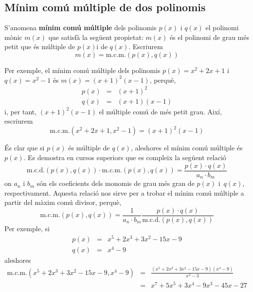 \subsection{Mínim comú múltiple de dos polinomis}

S'anomena \textbf{mínim comú múltiple} dels polinomis $p(x)$
i $q(x)$ el polinomi mònic $m(x)$ que satisfà la següent
propietat: $m(x)$ és el polinomi de grau més petit que és múltiple de $p(x) $i de $q(x)$. Escriurem\begin{equation*}
m(x)=\text{m.c.m.}\left( p(x),q(x)\right)
\end{equation*}

Per exemple, el mínim comú múltiple dels polinomis $p(x)=x^{2}+2x+1$ i $q(x)=x^{2}-1$ és $m(x)=(x+1)^{2}(x-1)$, perquè,\begin{eqnarray*}
p(x) &=&(x+1)^{2} \\
q(x) &=&(x+1)(x-1)
\end{eqnarray*}i, per tant, $(x+1)^{2}(x-1)$ el múltiple comú de més petit
grau. Així, escriurem\begin{equation*}
\text{m.c.m.}\left( x^{2}+2x+1,x^{2}-1\right) =(x+1)^{2}(x-1)
\end{equation*}

És clar que si $p(x)$ és múltiple de $q(x)$, aleshores el mínim comú múltiple és $p(x)$. Es demostra en cursos superiors que es
compleix la següent relació\begin{equation*}
\text{m.c.d.}\left( p(x),q(x)\right) \cdot \text{m.c.m.}\left(
p(x),q(x)\right) =\frac{p(x)\cdot q(x)}{a_{n}\cdot b_{m}}
\end{equation*}on $a_{n}$ i $b_{m}$ són els coeficients dels monomis de grau més gran
de $p(x)$ i~$q(x)$, respectivament. Aquesta relació nos sirve per a trobar
el mínim comú múltiple a partir del màxim comú
divisor, perquè,\begin{equation*}
\text{m.c.m.}\left( p(x),q(x)\right) =\frac{1}{a_{n}\cdot b_{m}}\frac{p(x)\cdot q(x)}{\text{m.c.d.}\left( p(x),q(x)\right) }
\end{equation*}Per exemple, si
\begin{eqnarray*}
p(x) &=&x^{5}+2x^{3}+3x^{2}-15x-9 \\
q(x) &=&x^{4}-9
\end{eqnarray*}aleshores\begin{eqnarray*}
\text{m.c.m.}\left( x^{5}+2x^{3}+3x^{2}-15x-9,x^{4}-9\right) &=&\frac{(x^{5}+2x^{3}+3x^{2}-15x-9)(x^{4}-9)}{x^{2}-3} \\
&=&x^{7}+5x^{5}+3x^{4}-9x^{3}-45x-27
\end{eqnarray*}

